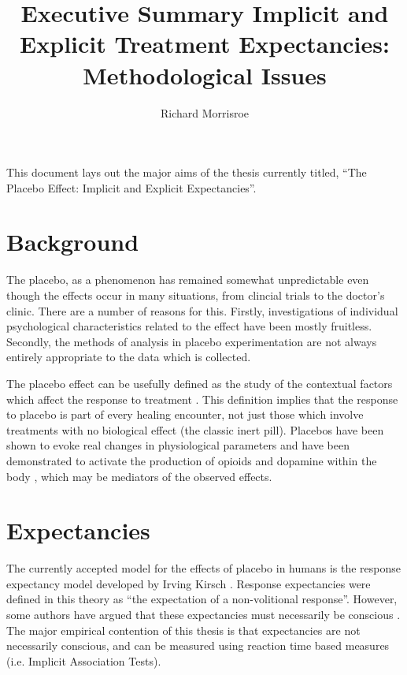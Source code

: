 \documentclass{article}
\title{Executive Summary Implicit and Explicit Treatment Expectancies: Methodological Issues}
\author{Richard Morrisroe}
\begin{document}
\maketitle

This document lays out the major aims of the thesis currently titled, ``The Placebo Effect: Implicit and Explicit Expectancies''. 

\section{Background}
\label{sec:background}



The placebo, as a phenomenon has remained somewhat unpredictable even though the effects occur in many situations, from clincial trials to the doctor's clinic. There are a number of reasons for this. Firstly, investigations of individual psychological characteristics related to the effect have been mostly fruitless. Secondly, the methods of analysis in placebo experimentation are not always entirely appropriate to the data which is collected.

The placebo effect can be usefully defined as the study of the contextual factors which affect the response to treatment \citep{Kaptchuk2008}. This definition implies that the response to placebo is part of every healing encounter, not just those which involve treatments with no biological effect (the classic inert pill). Placebos have been shown to evoke real changes in physiological parameters and have been demonstrated to activate the production of opioids and dopamine within the body \citep{Sauro2005}, which may be mediators of the observed effects.   

\section{Expectancies}
\label{sec:expectancies}

The currently accepted model for the effects of placebo in humans is the response expectancy model developed by Irving Kirsch \citep{Kirsch1997,Kirsch1985}. Response expectancies were defined in this theory as ``the expectation of a non-volitional response''. However, some authors have argued that these expectancies must necessarily be conscious \citep{Stewart-Williams2004b}. The major empirical contention of this thesis is that expectancies are not necessarily conscious, and can be measured using reaction time based measures (i.e. Implicit Association Tests).
\end{document}
